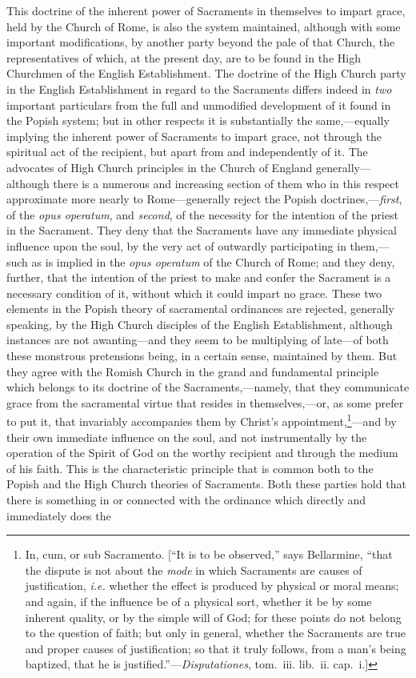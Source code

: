 \documentclass[
]{book}
\begin{document}
This doctrine of the inherent power of Sacraments in themselves to impart grace, held by the Church of Rome, is also the system maintained, although with some important modifications, by another party beyond the pale of that Church, the representatives of which, at the present day, are to be found in the High Churchmen of the English Establishment. The doctrine of the High Church party in the English Establishment in regard to the Sacraments differs indeed in \emph{two} important particulars from the full and unmodified development of it found in the Popish system; but in other respects it is substantially the same,---equally implying the inherent power of Sacraments to impart grace, not through the spiritual act of the recipient, but apart from and independently of it. The advocates of High Church principles in the Church of England generally---although there is a numerous and increasing section of them who in this respect approximate more nearly to Rome---generally reject the Popish doctrines,---\emph{first}, of the \foreignlanguage{latin}{\emph{opus operatum}}, and \emph{second}, of the necessity for the intention of the priest in the Sacrament. They deny that the Sacraments have any immediate physical influence upon the soul, by the very act of outwardly participating in them,---such as is implied in the \foreignlanguage{latin}{\emph{opus operatum}} of the Church of Rome; and they deny, further, that the intention of the priest to make and confer the Sacrament is a necessary condition of it, without which it could impart no grace. These two elements in the Popish theory of sacramental ordinances are rejected, generally speaking, by the High Church disciples of the English Establishment, although instances are not awanting---and they seem to be multiplying of late---of both these monstrous pretensions being, in a certain sense, maintained by them. But they agree with the Romish Church in the grand and fundamental principle which belongs to its doctrine of the Sacraments,---namely, that they communicate grace from the sacramental virtue that resides in themselves,---or, as some prefer to put it, that invariably accompanies them by Christ's appointment,\footnote{In, \foreignlanguage{latin}{cum}, or \foreignlanguage{latin}{sub Sacramento}. {[}``It is to be observed,'' says Bellarmine, ``that the dispute is not about the \emph{mode} in which Sacraments are causes of justification, \emph{i.e.} whether the effect is produced by physical or moral means; and again, if the influence be of a physical sort, whether it be by some inherent quality, or by the simple will of God; for these points do not belong to the question of faith; but only in general, whether the Sacraments are true and proper causes of justification; so that it truly follows, from a man's being baptized, that he is justified.''---\foreignlanguage{latin}{\emph{Disputationes}}, tom.~iii. lib.~ii. cap.~i.{]}}---and by their own immediate influence on the soul, and not instrumentally by the operation of the Spirit of God on the worthy recipient and through the medium of his faith. This is the characteristic principle that is common both to the Popish and the High Church theories of Sacraments. Both these parties hold that there is something in or connected with the ordinance which directly and immediately does the 
\end{document}
